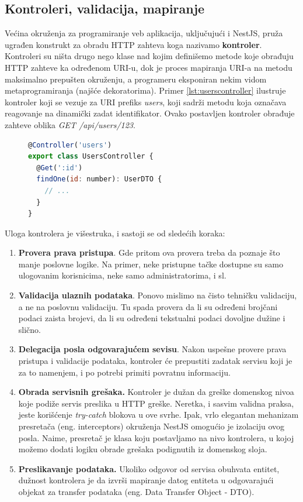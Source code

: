 \documentclass[12pt,oneside]{memoir}
\begin{document}
\subsection{Kontroleri, validacija, mapiranje}

Većina okruženja za programiranje veb aplikacija, uključujući i NestJS, pruža ugrađen konstrukt za obradu HTTP zahteva koga nazivamo \textbf{kontroler}. Kontroleri su ništa drugo nego klase nad kojim definišemo metode koje obrađuju HTTP zahteve ka određenom URI-u, dok je proces mapiranja URI-a na metodu maksimalno prepušten okruženju, a programeru eksponiran nekim vidom metaprogramiranja (najšće dekoratorima). Primer \ref{lst:userscontroller} ilustruje kontroler koji se vezuje za URI prefiks \textit{users}, koji sadrži metodu koja označava reagovanje na dinamički zadat identifikator. Ovako postavljen kontroler obrađuje zahteve oblika \textit{GET /api/users/123}.

\begin{figure}[h]
\begin{lstlisting}[language=JavaScript, style=ES6, caption={primer kontrolera}, label={lst:userscontroller}]
@Controller('users')
export class UsersController {
  @Get(':id')
  findOne(id: number): UserDTO {
    // ...
  }
}
\end{lstlisting}
\end{figure}

Uloga kontrolera je višestruka, i sastoji se od sledećih koraka:
\begin{enumerate}
    \item \textbf{Provera prava pristupa}. Gde pritom ova provera treba da poznaje što manje poslovne logike. Na primer, neke pristupne tačke dostupne su samo ulogovanim korisnicima, neke samo administratorima, i sl.
    \item \textbf{Validacija ulaznih podataka}. Ponovo mislimo na čisto tehničku validaciju, a ne na poslovnu validaciju. Tu spada provera da li su određeni brojčani podaci zaista brojevi, da li su određeni tekstualni podaci dovoljne dužine i slično.
    \item \textbf{Delegacija posla odgovarajućem sevisu}. Nakon uspešne provere prava pristupa i validacije podataka, kontroler će prepustiti zadatak servisu koji je za to namenjem, i po potrebi primiti povratnu informaciju.
    \item \textbf{Obrada servisnih grešaka.} Kontroler je dužan da greške domenskog nivoa koje podiže servis preslika u HTTP greške. Neretka, i sasvim validna praksa, jeste korišćenje \textit{try-catch} blokova u ove svrhe. Ipak, vrlo elegantan mehanizam presretača (eng. interceptors) okruženja NestJS omogućio je izolaciju ovog posla. Naime, presretač je klasa koju postavljamo na nivo kontrolera, u kojoj možemo dodati logiku obrade grešaka podignutih iz domenskog sloja.
    \item \textbf{Preslikavanje podataka.} Ukoliko odgovor od servisa obuhvata entitet, dužnost kontrolera je da izvrši mapiranje datog entiteta u odgovarajući objekat za transfer podataka (eng. Data Transfer Object - DTO).
\end{enumerate}
\end{document}
